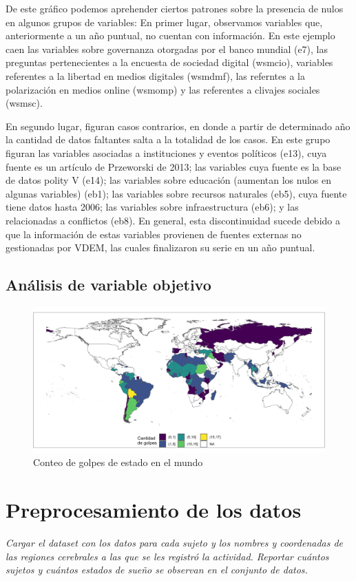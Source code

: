 \documentclass{article}
\begin{document}
De este gráfico podemos aprehender ciertos patrones sobre la presencia de nulos
en algunos grupos de variables: En primer lugar, observamos variables que,
anteriormente a un año puntual, no cuentan con información. En este ejemplo caen
las variables sobre governanza otorgadas por el banco mundial (e7), las preguntas
pertenecientes a la encuesta de sociedad digital (wsmcio), variables referentes a
la libertad en medios digitales (wsmdmf), las referntes a la polarización en medios
online (wsmomp) y las referentes a clivajes sociales (wsmsc).

En segundo lugar, figuran casos contrarios, en donde a partir de determinado año
la cantidad de datos faltantes salta a la totalidad de los casos. En este grupo
figuran las variables asociadas a instituciones y eventos políticos (e13), cuya 
fuente es un artículo de Przeworski de 2013; las variables cuya fuente es la base
de datos polity V (e14); las variables sobre educación (aumentan los nulos en algunas 
variables) (eb1); las variables sobre recursos naturales (eb5), cuya fuente tiene
datos hasta 2006; las variables sobre infraestructura (eb6); y las relacionadas a 
conflictos (eb8). En general, esta discontinuidad sucede debido a que la información
de estas variables provienen de fuentes externas no gestionadas por VDEM, las cuales
finalizaron su serie en un año puntual.

\subsection{Análisis de variable objetivo}

\begin{figure}[H]
  \centering  
  \includegraphics[width=1\textwidth]{2_golpes.png}
  \caption{Conteo de golpes de estado en el mundo}
\end{figure}


\section{Preprocesamiento de los datos}

\textit{Cargar el dataset con los datos para cada sujeto y los nombres y coordenadas 
de las regiones cerebrales a las que se les registró la actividad. Reportar cuántos sujetos y cuántos estados de sueño se observan en el conjunto de
datos.}

\printbibliography
\end{document}
